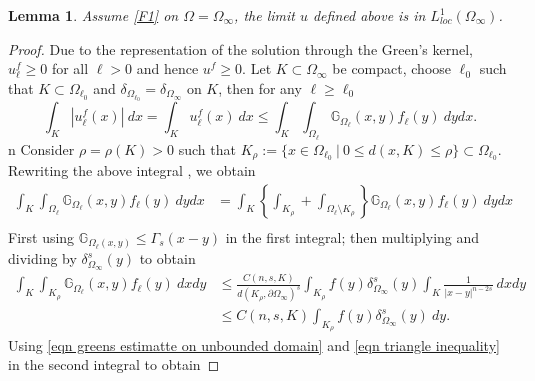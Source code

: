 \documentclass{amsart}
\newtheorem{lemma}[theorem]{Lemma}
\newcommand{\gk}[1]{\mathbb{G}_{#1}}
\newcommand{\ul}{u_{\ell}}
\begin{document}
\begin{lemma}
   Assume \ref{F1} on $\Omega=\Omega_{\infty}$, the limit $u$ defined above is in $L^{1}_{loc}(\Omega_{\infty})$.
\end{lemma}
\begin{proof}
    Due to the representation of the solution through the Green's kernel, $\ul^{f}\geq0$ for all $\ell>0$ and hence $u^{f}\geq 0$. Let $K\subset \Omega_{\infty}$ be compact, choose $\ell_{0}$ such that $K\subset \Omega_{\ell_{0}}$ and $\delta_{\Omega_{\ell_{0}}}=\delta_{\Omega_{\infty}}$ on $K$, then for any $\ell\geq \ell_{0}$ 
    \begin{equation*}
        \int_{K}|\ul^{f}(x)|\ dx=\int_{K}\ul^{f}(x)\ dx \leq \int_{K} \int_{\Omega_{\ell}}\gk{\Omega_{\ell}}(x,y) f_{\ell}(y)\ dy dx .
    \end{equation*}n
        Consider $\rho=\rho(K)>0$ such that $K_{\rho}:=\{x\in \Omega_{\ell_{0}} ~|~ 0\leq d(x,K)\leq \rho\} \subset \Omega_{\ell_{0}}$. Rewriting the above integral , we obtain 
        \begin{equation*}
            \begin{split}
                 \int_{K} \int_{\Omega_{\ell}}\gk{\Omega_{\ell}}(x,y) f_{\ell}(y) \ dydx 
                &=\int_{K}\left\{\int_{K_{\rho}}+\int_{\Omega_{\ell}\setminus K_{\rho}}\right\}\gk{\Omega_{\ell}}(x,y) f_{\ell}(y) \ dydx\\
            \end{split}
        \end{equation*}
        First using $\gk{\Omega_{\ell}(x,y)}\leq \Gamma_{s}(x-y)$ in the first integral; then multiplying and dividing by $\delta_{\Omega_{\infty}}^{s}(y)$ to obtain
        \begin{equation*}
            \begin{split}
                \int_{K}\int_{K_{\rho}}\gk{\Omega_{\ell}}(x,y) f_{\ell}(y)\ dxdy &\leq \frac{C(n,s, K)}{d(K_{\rho},\partial\Omega_{\infty})^{s}}\int_{K_{\rho}}f(y)\delta_{\Omega_{\infty}}^{s}(y)\int_{K}\frac{1}{|x-y|^{n-2s}}\ dx dy\\
                &\leq C(n,s,K)\int_{K_{\rho}}f(y)\delta_{\Omega_{\infty}}^{s}(y)\ dy.
            \end{split}
        \end{equation*}
        Using \eqref{eqn greens estimatte on unbounded domain} and \eqref{eqn triangle inequality} in the second integral to obtain

\end{proof}
\end{document}
